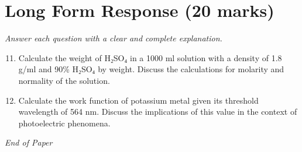\documentclass[12pt]{article}
\begin{document}
\section*{Long Form Response (20 marks)}
\textit{Answer each question with a clear and complete explanation.}
\begin{enumerate}[label=\arabic*.]
\setcounter{enumi}{10}
\item Calculate the weight of H₂SO₄ in a 1000 ml solution with a density of 1.8 g/ml and 90\%
H₂SO₄ by weight. Discuss the calculations for molarity and normality of the solution.
\item Calculate the work function of potassium metal given its threshold wavelength of 564 nm.
Discuss the implications of this value in the context of photoelectric phenomena.
\end{enumerate}

\vfill
\noindent\textit{End of Paper}
\end{document}
